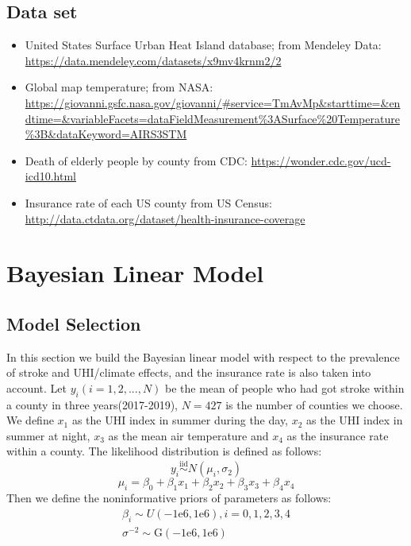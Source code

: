 \documentclass{article}
\begin{document}
\subsection{Data set}
\begin{itemize}
    \item United States Surface Urban Heat Island database; from Mendeley Data: \url{https://data.mendeley.com/datasets/x9mv4krnm2/2}
    \item Global map temperature; from NASA: \url{https://giovanni.gsfc.nasa.gov/giovanni/#service=TmAvMp&starttime=&endtime=&variableFacets=dataFieldMeasurement%3ASurface%20Temperature%3B&dataKeyword=AIRS3STM}
    \item Death of elderly people by county from CDC: \url{https://wonder.cdc.gov/ucd-icd10.html}
    \item Insurance rate of each US county from US Census: \url{http://data.ctdata.org/dataset/health-insurance-coverage}
\end{itemize}

\section{Bayesian Linear Model}
\subsection{Model Selection}
In this section we build the Bayesian linear model with respect to the prevalence of stroke and UHI/climate effects, and the insurance rate is also taken into account. Let $y_i(i=1,2,...,N)$ be the mean of people who had got stroke within a county in three years(2017-2019), $N=427$ is the number of counties we choose. We define $x_1$ as the UHI index in summer during the day, $x_2$ as the UHI index in summer at night, $x_3$ as the mean air temperature and $x_4$ as the insurance rate within a county. The likelihood distribution is defined as follows:
\begin{equation}\label{d}
        y_i \overset{\mathrm{iid}}{\sim} N(\mu_i,\sigma_2)
\end{equation}
\begin{equation}\label{d}
	\mu_i=\beta_0+\beta_1x_1+\beta_2x_2+\beta_3x_3+\beta_4x_4
\end{equation}
Then we define the noninformative priors of parameters as follows:
\begin{equation}
	\begin{aligned}
		\beta_i\sim U(-1\mathrm{e}6,1\mathrm{e}6),i=0,1,2,3,4
		\\
		\sigma^{-2}\sim \mathrm{G}(-1\mathrm{e}6,1\mathrm{e}6)
	\end{aligned}
\end{equation}
\end{document}
